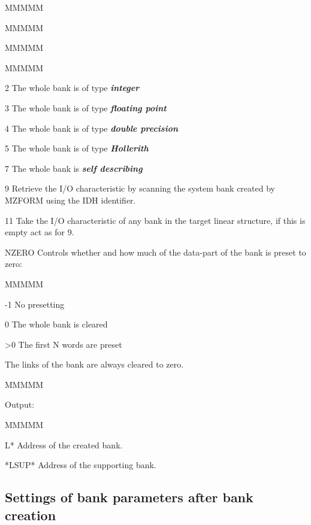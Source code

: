 \begin{DL}{MMMMM}
\begin{DL}{MMMMM}
\begin{DL}{MMMMM}
\begin{DL}{MMMMM}
\item[ 2
]The whole bank is of type {\bf\it integer}
\item[ 3
]The whole bank is of type {\bf\it floating point}
\item[ 4
]The whole bank is of type {\bf\it double precision}
\item[ 5
]The whole bank is of type {\bf\it Hollerith}
\item[ 7
]The whole bank is {\bf\it self describing}
\item[ 9
]Retrieve the I/O characteristic by scanning the system
bank created by MZFORM using the IDH identifier.
\item[ 11
]Take the I/O characteristic of any bank in the
target linear structure, if this is empty act as for 9.
\end{DL}
\end{DL}
\item[NZERO
]Controls whether and how much of the data-part
of the bank is preset to zero:
\begin{DL}{MMMMM}
\item[-1
]No presetting
\item[ 0
]The whole bank is cleared
\item[>0
]The first N words are preset
\end{DL}
\newline The links of the bank are always cleared to zero.
\end{DL}
\end{DL}
\begin{DL}{MMMMM}
\item[Output:
]
\begin{DL}{MMMMM}
\item[L*
]Address of the created bank.
\item[*LSUP*
]Address of the supporting bank.
\end{DL}
\end{DL}
\subsection{Settings of bank parameters after bank creation}
